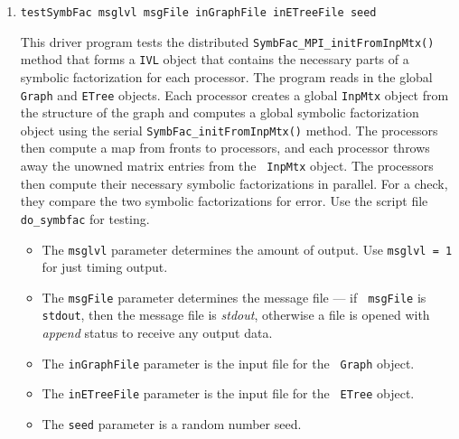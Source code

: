 \begin{enumerate}
\item
\begin{verbatim}
testSymbFac msglvl msgFile inGraphFile inETreeFile seed 
\end{verbatim}
This driver program tests the distributed 
{\tt SymbFac\_MPI\_initFromInpMtx()} method
that forms a {\tt IVL} object that contains the necessary parts of
a symbolic factorization for each processor.
The program reads in the global {\tt Graph} and {\tt ETree}
objects.
Each processor creates a global {\tt InpMtx} object from the
structure of the graph and computes a global symbolic factorization
object using the serial {\tt SymbFac\_initFromInpMtx()} method.
The processors then compute a map from fronts to processors, and
each processor throws away the unowned matrix entries from the {\tt
InpMtx} object.
The processors then compute their necessary symbolic factorizations
in parallel.
For a check, they compare the two symbolic factorizations for error.
Use the script file {\tt do\_symbfac} for testing.
\par
\begin{itemize}
\item
The {\tt msglvl} parameter determines the amount of output.
Use {\tt msglvl = 1} for just timing output.
\item
The {\tt msgFile} parameter determines the message file --- if {\tt
msgFile} is {\tt stdout}, then the message file is {\it stdout},
otherwise a file is opened with {\it append} status to receive any
output data.
\item
The {\tt inGraphFile} parameter is the input file for the {\tt
Graph} object.
\item
The {\tt inETreeFile} parameter is the input file for the {\tt
ETree} object.
\item
The {\tt seed} parameter is a random number seed.
\end{itemize}
\end{enumerate}
